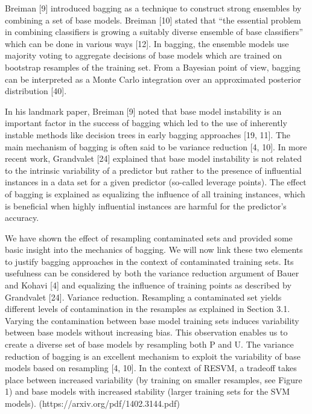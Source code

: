 Breiman [9] introduced bagging as a technique to construct strong ensembles by combining a set of base models. Breiman [10] stated that “the essential problem in combining classiﬁers is growing a suitably diverse ensemble of base classiﬁers” which can be done in various ways [12]. In bagging, the ensemble models use majority voting to aggregate decisions of base models which are trained on bootstrap resamples of the training set. From a Bayesian point of view, bagging can be interpreted as a Monte Carlo integration over an approximated posterior distribution [40]. 

In his landmark paper, Breiman [9] noted that base model instability is an important factor in the success of bagging which led to the use of inherently instable methods like decision trees in early bagging approaches [19, 11]. The main mechanism of bagging is often said to be variance reduction [4, 10]. In more recent work, Grandvalet [24] explained that base model instability is not related to the intrinsic variability of a predictor but rather to the presence of inﬂuential instances in a data set for a given predictor (so-called leverage points).
The eﬀect of bagging is explained as equalizing the inﬂuence of all training instances, which is beneﬁcial when highly inﬂuential instances are harmful for the predictor’s accuracy.

We have shown the eﬀect of resampling contaminated sets and provided some basic insight into the mechanics of bagging. We will now link these two elements to justify bagging approaches in the context of contaminated training sets. Its usefulness can be considered by both the variance reduction argument of Bauer and Kohavi [4] and equalizing the inﬂuence of training points as described by Grandvalet [24]. Variance reduction. Resampling a contaminated set yields diﬀerent levels of contamination in the resamples as explained in Section 3.1. Varying the contamination between base model training sets induces variability between base models without increasing bias. This observation enables us to create a diverse set of base models by resampling both P and U. The variance reduction of bagging is an excellent mechanism to exploit the variability of base models based on resampling [4, 10]. In the context of RESVM, a tradeoﬀ takes place between increased variability (by training on smaller resamples, see Figure 1) and base models with increased stability (larger training sets for the SVM models). (https://arxiv.org/pdf/1402.3144.pdf)

\hfill \\

